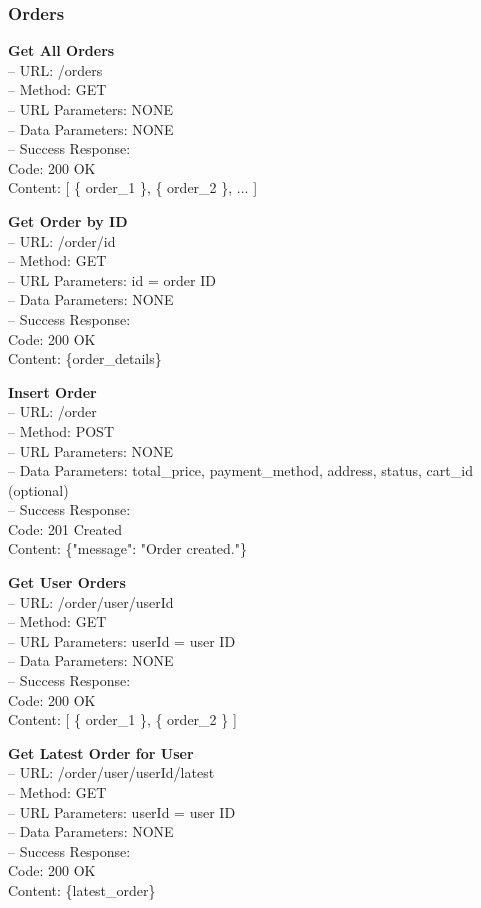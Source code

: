 \subsubsection*{Orders}

\textbf{Get All Orders} \\
– URL: /orders \\
– Method: GET \\
– URL Parameters: NONE \\
– Data Parameters: NONE \\
– Success Response: \\
Code: 200 OK \\
Content: [ \{ order\_1 \}, \{ order\_2 \}, ... ]

\textbf{Get Order by ID} \\
– URL: /order/{id} \\
– Method: GET \\
– URL Parameters: id = order ID \\
– Data Parameters: NONE \\
– Success Response: \\
Code: 200 OK \\
Content: \{order\_details\}

\textbf{Insert Order} \\
– URL: /order \\
– Method: POST \\
– URL Parameters: NONE \\
– Data Parameters: total\_price, payment\_method, address, status, cart\_id (optional) \\
– Success Response: \\
Code: 201 Created \\
Content: \{"message": "Order created."\}

\textbf{Get User Orders} \\
– URL: /order/user/{userId} \\
– Method: GET \\
– URL Parameters: userId = user ID \\
– Data Parameters: NONE \\
– Success Response: \\
Code: 200 OK \\
Content: [ \{ order\_1 \}, \{ order\_2 \} ]

\textbf{Get Latest Order for User} \\
– URL: /order/user/{userId}/latest \\
– Method: GET \\
– URL Parameters: userId = user ID \\
– Data Parameters: NONE \\
– Success Response: \\
Code: 200 OK \\
Content: \{latest\_order\}

